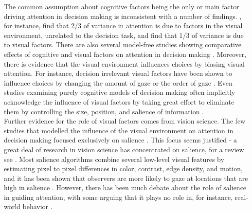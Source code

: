 The common assumption about cognitive factors being the only or main factor driving attention in decision making is inconsistent with a number of findings. \cite{vanderlans2008}, for instance, find that 2/3 of variance in attention is due to factors in the visual environment, unrelated to the decision task, and \cite{towal2013a} find that 1/3 of variance is due to visual factors. There are also several model-free studies showing comparative effects of cognitive and visual factors on attention in decision making \citep{gidloef2017a, orquin2015a, orquin2019a}. Moreover, there is evidence that the visual environment influences choices by biasing visual attention. For instance, decision irrelevant visual factors have been shown to influence choices by changing the amount of gaze \citep{peschel2019, chandon2009a} or the order of gaze \citep{reeck2017a}. Even studies examining purely cognitive models of decision making often implicitly acknowledge the influence of visual factors by taking great effort to eliminate them by controlling the size, position, and salience of information \citep{brandstatter2014, gloeckner2011a, perkovic2018}.\\

Further evidence for the role of visual factors comes from vision science. The few studies that modelled the influence of the visual environment on attention in decision making focused exclusively on salience \citep{chen2013,navalpakkam2010, towal2013a}. This focus seems justified - a great deal of research in vision science has concentrated on salience, for a review see \cite{borji2012a}. Most salience algorithms combine several low-level visual features by estimating pixel to pixel differences in color, contrast, edge density, and motion, and it has been shown that observers are more likely to gaze at locations that are high in salience \citep{itti2000}. However, there has been much debate about the role of salience in guiding attention, with some arguing that it plays no role in, for instance, real-world behavior \citep{tatler2011a}.\\

